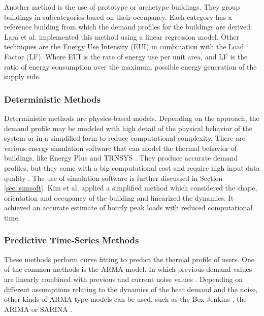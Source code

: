Another method is the use of prototype or archetype buildings. They group buildings in subcategories based on their occupancy. Each category has a reference building from which the demand profiles for the buildings are derived. Lara et al. \cite{ARAMBULALARA2015160} implemented this method using a linear regression model. Other techniques are the Energy Use Intensity (EUI) \cite{sharp1996energy} in combination with the Load Factor (LF)\cite{DALLAROSA20116890}. Where EUI is the rate of energy use per unit area, and LF is the ratio of energy consumption over the maximum possible energy generation of the supply side.


\subsubsection{Deterministic Methods}
Deterministic methods are physics-based models. Depending on the approach, the demand profile may be modeled with high detail of the physical behavior of the system or in a simplified form to reduce computational complexity. There are various energy simulation software that can model the thermal behavior of buildings, like Energy Plus \cite{EnergyPlus} and TRNSYS \cite{trnsys1975}. They produce accurate demand profiles, but they come with a big computational cost and require high input data quality \cite{GUADALFAJARA20141096}. The use of simulation software is further discussed in Section \ref{sec::simsoft}. Kim et al. \cite{KIM} applied a simplified method which considered the shape, orientation and occupancy of the building and linearized the dynamics. It achieved an accurate estimate of hourly peak loads with reduced computational time.
 
\subsubsection{Predictive Time-Series Methods}
These methods perform curve fitting to predict the thermal profile of users. One of the common methods is the ARMA model. In which previous demand values are linearly combined with previous and current noise values \cite{GRossGaliana}. Depending on different assumptions relating to the dynamics of the heat demand and the noise, other kinds of ARMA-type models can be used, such as the Box-Jenkins \cite{BoxJenkins}, the ARIMA \cite{ARINA} or SARINA \cite{SARINA}.

